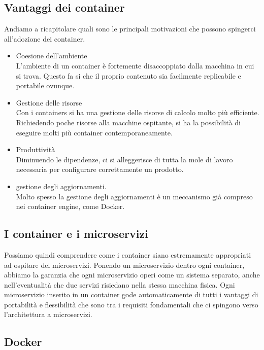 \subsection{Vantaggi dei container}
Andiamo a ricapitolare quali sono le principali motivazioni che possono spingerci all'adozione dei container.
\begin{itemize}
	\item Coesione dell'ambiente \\
	L'ambiente di un container è fortemente disaccoppiato dalla macchina in cui si trova. Questo fa si che il proprio contenuto sia facilmente replicabile e portabile ovunque.
	
	\item Gestione delle risorse \\
	Con i containers si ha una gestione delle risorse di calcolo molto più efficiente. Richiedendo poche risorse alla macchine ospitante, si ha la possibilità di eseguire molti più container contemporaneamente. 
	
	\item Produttività \\
	Diminuendo le dipendenze, ci si alleggerisce di tutta la mole di lavoro necessaria per configurare correttamente un prodotto. 
	
	\item gestione degli aggiornamenti. \\
	Molto spesso la gestione degli aggiornamenti è un meccanismo già compreso nei container engine, come Docker.
\end{itemize}

\subsection{I container e i microservizi}
Possiamo quindi comprendere come i container siano estremamente appropriati ad ospitare del microservizi. Ponendo un microservizio dentro ogni container, abbiamo la garanzia che ogni microservizio operi come un sistema separato, anche nell'eventualità che due servizi risiedano nella stessa macchina fisica. Ogni microservizio inserito in un container gode automaticamente di tutti i vantaggi di portabilità e flessibilità che sono tra i requisiti fondamentali che ci spingono verso l'architettura a microservizi.

\subsection{Docker}

